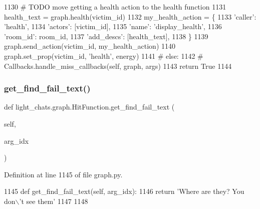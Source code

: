 \begin{DoxyCode}
1130                 \textcolor{comment}{# TODO move getting a health action to the health function}
1131                 health\_text = graph.health(victim\_id)
1132                 my\_health\_action = \{
1133                     \textcolor{stringliteral}{'caller'}: \textcolor{stringliteral}{'health'},
1134                     \textcolor{stringliteral}{'actors'}: [victim\_id],
1135                     \textcolor{stringliteral}{'name'}: \textcolor{stringliteral}{'display\_health'},
1136                     \textcolor{stringliteral}{'room\_id'}: room\_id,
1137                     \textcolor{stringliteral}{'add\_descs'}: [health\_text],
1138                 \}
1139                 graph.send\_action(victim\_id, my\_health\_action)
1140             graph.set\_prop(victim\_id, \textcolor{stringliteral}{'health'}, energy)
1141         \textcolor{comment}{# else:}
1142         \textcolor{comment}{#     Callbacks.handle\_miss\_callbacks(self, graph, args)}
1143         \textcolor{keywordflow}{return} \textcolor{keyword}{True}
1144 
\end{DoxyCode}
\mbox{\label{classlight__chats_1_1graph_1_1HitFunction_a3682574dfb01b39b2cec972e8a90d762}} 
\subsubsection{\texorpdfstring{get\+\_\+find\+\_\+fail\+\_\+text()}{get\_find\_fail\_text()}}
{\footnotesize\ttfamily def light\+\_\+chats.\+graph.\+Hit\+Function.\+get\+\_\+find\+\_\+fail\+\_\+text (\begin{DoxyParamCaption}\item[{}]{self,  }\item[{}]{arg\+\_\+idx }\end{DoxyParamCaption})}



Definition at line 1145 of file graph.\+py.


\begin{DoxyCode}
1145     \textcolor{keyword}{def }get\_find\_fail\_text(self, arg\_idx):
1146         \textcolor{keywordflow}{return} \textcolor{stringliteral}{'Where are they? You don\(\backslash\)'t see them'}
1147 
1148 
\end{DoxyCode}
\mbox{\label{classlight__chats_1_1graph_1_1HitFunction_afcc616271cdc3acede3dcabdfe516598}} 
